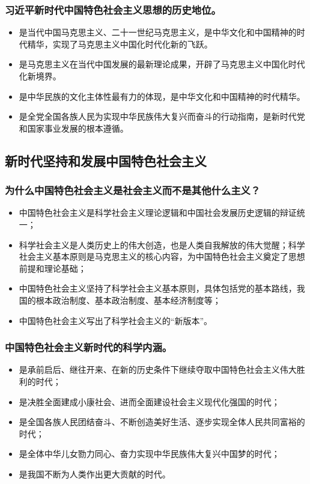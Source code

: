 \documentclass{article}
\begin{document}
\subsubsection{习近平新时代中国特色社会主义思想的历史地位。}
\begin{itemize}
    \item 是当代中国马克思主义、二十一世纪马克思主义，是中华文化和中国精神的时代精华，实现了马克思主义中国化时代化新的飞跃。
    \item 是马克思主义在当代中国发展的最新理论成果，开辟了马克思主义中国化时代化新境界。
    \item 是中华民族的文化主体性最有力的体现，是中华文化和中国精神的时代精华。
    \item 是全党全国各族人民为实现中华民族伟大复兴而奋斗的行动指南，是新时代党和国家事业发展的根本遵循。
\end{itemize}

\subsection{新时代坚持和发展中国特色社会主义}

\subsubsection{为什么中国特色社会主义是社会主义而不是其他什么主义？}
\begin{itemize}
    \item 中国特色社会主义是科学社会主义理论逻辑和中国社会发展历史逻辑的辩证统一；
    \item 科学社会主义是人类历史上的伟大创造，也是人类自我解放的伟大觉醒；科学社会主义基本原则是马克思主义的核心内容，为中国特色社会主义奠定了思想前提和理论基础；
    \item 中国特色社会主义坚持了科学社会主义基本原则，具体包括党的基本路线，我国的根本政治制度、基本政治制度、基本经济制度等；
    \item 中国特色社会主义写出了科学社会主义的“新版本”。
\end{itemize}

\subsubsection{中国特色社会主义新时代的科学内涵。}
\begin{itemize}
    \item 是承前启后、继往开来、在新的历史条件下继续夺取中国特色社会主义伟大胜利的时代；
    \item 是决胜全面建成小康社会、进而全面建设社会主义现代化强国的时代；
    \item 是全国各族人民团结奋斗、不断创造美好生活、逐步实现全体人民共同富裕的时代；
    \item 是全体中华儿女勠力同心、奋力实现中华民族伟大复兴中国梦的时代；
    \item 是我国不断为人类作出更大贡献的时代。
\end{itemize}
\end{document}
